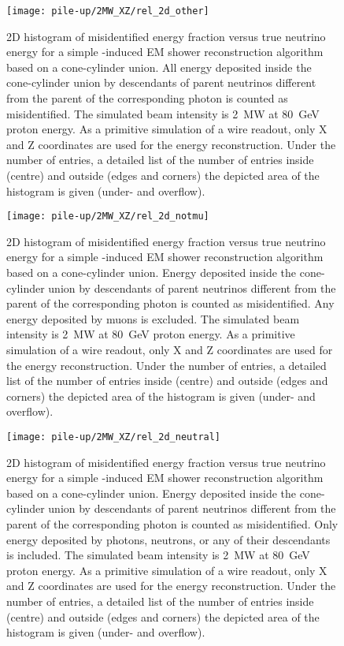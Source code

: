 \begin{figure}[htb]
	\centering
	\texttt{[image: pile-up/2MW\_XZ/rel\_2d\_other]}
	\caption{2D histogram of misidentified energy fraction versus true neutrino energy for a simple \Pgpz-induced EM shower reconstruction algorithm based on a cone-cylinder union.
		All energy deposited inside the cone-cylinder union by descendants of parent neutrinos different from the parent of the corresponding \Pgpz photon is counted as misidentified.
		The simulated beam intensity is \SI{2}{\mega\watt} at \SI{80}{\giga\electronvolt} proton energy.
		As a primitive simulation of a wire readout, only X and Z coordinates are used for the energy reconstruction.
		Under the number of entries, a detailed list of the number of entries inside (centre) and outside (edges and corners) the depicted area of the histogram is given (under- and overflow).}
\end{figure}

\begin{figure}[htb]
	\centering
	\texttt{[image: pile-up/2MW\_XZ/rel\_2d\_notmu]}
	\caption{2D histogram of misidentified energy fraction versus true neutrino energy for a simple \Pgpz-induced EM shower reconstruction algorithm based on a cone-cylinder union.
		Energy deposited inside the cone-cylinder union by descendants of parent neutrinos different from the parent of the corresponding \Pgpz photon is counted as misidentified.
		Any energy deposited by muons is excluded.
		The simulated beam intensity is \SI{2}{\mega\watt} at \SI{80}{\giga\electronvolt} proton energy.
		As a primitive simulation of a wire readout, only X and Z coordinates are used for the energy reconstruction.
		Under the number of entries, a detailed list of the number of entries inside (centre) and outside (edges and corners) the depicted area of the histogram is given (under- and overflow).}
\end{figure}

\begin{figure}[htb]
	\centering
	\texttt{[image: pile-up/2MW\_XZ/rel\_2d\_neutral]}
	\caption{2D histogram of misidentified energy fraction versus true neutrino energy for a simple \Pgpz-induced EM shower reconstruction algorithm based on a cone-cylinder union.
		Energy deposited inside the cone-cylinder union by descendants of parent neutrinos different from the parent of the corresponding \Pgpz photon is counted as misidentified.
		Only energy deposited by photons, neutrons, or any of their descendants is included.
		The simulated beam intensity is \SI{2}{\mega\watt} at \SI{80}{\giga\electronvolt} proton energy.
		As a primitive simulation of a wire readout, only X and Z coordinates are used for the energy reconstruction.
		Under the number of entries, a detailed list of the number of entries inside (centre) and outside (edges and corners) the depicted area of the histogram is given (under- and overflow).}
\end{figure}

